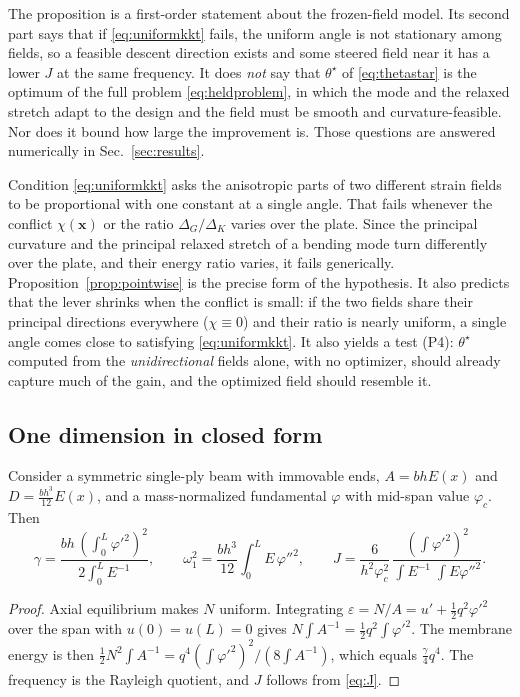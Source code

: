 \begin{remark}\label{rem:scope}
The proposition is a first-order statement about the frozen-field model. Its second part says
that if \eqref{eq:uniformkkt} fails, the uniform angle is not stationary among fields, so a
feasible descent direction exists and some steered field near it has a lower $J$ at the
same frequency. It does \emph{not} say that $\theta^\star$ of \eqref{eq:thetastar} is the
optimum of the full problem \eqref{eq:heldproblem}, in which the mode and the relaxed stretch
adapt to the design and the field must be smooth and curvature-feasible. Nor does it bound how
large the improvement is. Those questions are answered numerically in Sec.~\ref{sec:results}.
\end{remark}

Condition \eqref{eq:uniformkkt} asks the anisotropic parts of two different strain
fields to be proportional with one constant at a single angle. That fails whenever the
conflict $\chi(\bm x)$ or the ratio $\Delta_G/\Delta_K$ varies over the plate. Since the
principal curvature and the principal relaxed stretch of a bending mode turn differently
over the plate, and their energy ratio varies, it fails generically. Proposition~\ref{prop:pointwise} is the
precise form of the hypothesis. It also predicts that the lever shrinks when the conflict
is small: if the two fields share their principal directions everywhere ($\chi\equiv0$) and
their ratio is nearly uniform, a single angle comes close to satisfying \eqref{eq:uniformkkt}. It also yields a test (P4): $\theta^\star$ computed from
the \emph{unidirectional} fields alone, with no optimizer, should already capture much
of the gain, and the optimized field should resemble it.

\subsection{One dimension in closed form}\label{sec:beamtheory}
\begin{proposition}\label{prop:beam}
Consider a symmetric single-ply beam with immovable ends, $A=bhE(x)$ and
$D=\tfrac{bh^3}{12}E(x)$, and a mass-normalized fundamental $\varphi$ with mid-span value
$\varphi_c$. Then
\begin{equation}
\gamma=\frac{bh\,(\int_0^L\varphi'^2)^2}{2\int_0^LE^{-1}},\qquad
\omega_1^2=\frac{bh^3}{12}\int_0^LE\,\varphi''^2,\qquad
J=\frac{6}{h^2\varphi_c^2}\,
\frac{(\int\varphi'^2)^2}{\int E^{-1}\;\int E\varphi''^2}.
\label{eq:beamJ}
\end{equation}
\end{proposition}
\begin{proof}
Axial equilibrium makes $N$ uniform. Integrating $\varepsilon=N/A=u'+\tfrac12q^2\varphi'^2$
over the span with $u(0)=u(L)=0$ gives $N\int A^{-1}=\tfrac12q^2\int\varphi'^2$. The
membrane energy is then $\tfrac12N^2\int A^{-1}=q^4(\int\varphi'^2)^2/(8\int A^{-1})$,
which equals $\tfrac\gamma4q^4$. The frequency is the Rayleigh quotient, and $J$ follows
from \eqref{eq:J}.
\end{proof}

